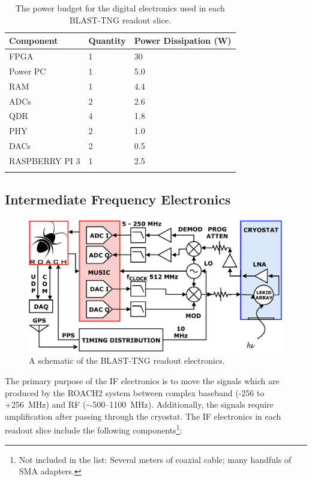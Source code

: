 \begin{table}[!htbp]
\centering
\begin{tabular}{@{}lll@{}}
\dtoprule
Component & Quantity & Power Dissipation (W) \\ \midrule
FPGA & 1 & 30 \\
Power PC & 1 & 5.0 \\
RAM & 1 & 4.4 \\
ADCs & 2 & 2.6 \\
QDR & 4 & 1.8 \\
PHY & 2 & 1.0 \\
DACs & 2 & 0.5 \\
RASPBERRY PI 3 & 1 & 2.5 \\ \dbottomrule
\\
\end{tabular}
\caption[~The power budget for the digital electronics used in each BLAST-TNG readout slice.]{The power budget for the digital electronics used in each BLAST-TNG readout slice.}
\label{tab:dig power budget}
\end{table}

\subsection{Intermediate Frequency Electronics}\label{if electronics}

\begin{figure}
\centering
\includegraphics[width=\textwidth]{figures/readout/schematics/readoutHardwareDefense}
\caption{A schematic of the BLAST-TNG readout electronics.}
\label{fig:hw schematic}
\end{figure}

The primary purpose of the IF electronics is to move the signals which are produced by the ROACH2 system between complex baseband (-256 to +256~MHz) and RF ($\sim$500--1100~MHz). Additionally, the signals require amplification after passing through the cryostat. The IF electronics in each readout slice include the following components\footnote{Not included in the list: Several meters of coaxial cable; many handfuls of SMA adapters.}:

